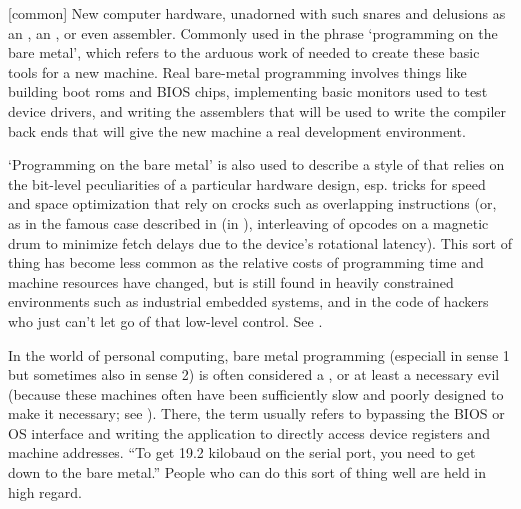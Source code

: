 
\begin{inparaenum}
    \item {[}common] New computer hardware, unadorned with such snares and
        delusions as an , an , or
        even assembler. Commonly used in the phrase `programming on the bare
        metal', which refers to the arduous work of 
        needed to create these basic tools for a new machine. Real bare-metal
        programming involves things like building boot roms and BIOS chips,
        implementing basic monitors used to test device drivers, and writing the
        assemblers that will be used to write the compiler back ends that will
        give the new machine a real development environment.
    \item `Programming on the bare metal' is also used to describe a style of
         that relies on the bit-level peculiarities of a
        particular hardware design, esp. tricks for speed and space optimization
        that rely on crocks such as overlapping instructions (or, as in the
        famous case described in  (in
        ), interleaving of opcodes on a magnetic drum to
        minimize fetch delays due to the device's rotational latency). This sort
        of thing has become less common as the relative costs of programming
        time and machine resources have changed, but is still found in heavily
        constrained environments such as industrial embedded systems, and in the
        code of hackers who just can't let go of that low-level control. See
        .
\end{inparaenum}

In the world of personal computing, bare metal programming (especiall in sense 1
but sometimes also in sense 2) is often considered a , or
at least a necessary evil (because these machines often have been sufficiently
slow and poorly designed to make it necessary; see ).
There, the term usually refers to bypassing the BIOS or OS interface and writing
the application to directly access device registers and machine addresses. ``To
get 19.2 kilobaud on the serial port, you need to get down to the bare metal.''
People who can do this sort of thing well are held in high regard.

